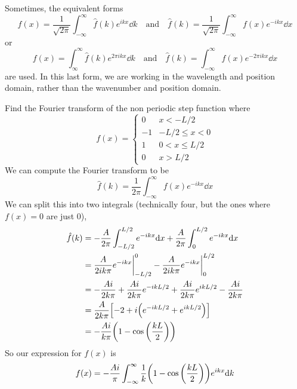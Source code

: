 Sometimes, the equivalent forms
\[ f(x) = \frac{1}{\sqrt{2\pi}}\int_{-\infty}^\infty \hat f(k)e^{ikx}\dd k \quad\text{and}\quad \hat f(k) = \frac{1}{\sqrt{2\pi}} \int_{-\infty}^\infty f(x)e^{-ikx}\dd x\]
or
\[ f(x) = \int_{\infty}^\infty \hat f(k)e^{2\pi ikx} \dd k \quad\text{and}\quad \hat f(k) = \int_{-\infty}^\infty f(x)e^{-2\pi ikx}\dd x\]
are used. In this last form, we are working in the wavelength and position domain, rather than the wavenumber and position domain.
\begin{example}
    Find the Fourier transform of the non periodic step function where 
    \[ f(x) = \begin{cases}
        0 & x < -L/2 \\
        -1 & -L/2 \le  x < 0 \\
        1 & 0 < x \le L/2 \\
        0 & x > L/2
    \end{cases}\]
    We can compute the Fourier transform to be
    \[ \hat f(k) = \frac{1}{2\pi} \int_{-\infty}^\infty f(x)e^{-ikx}\dd x\]
    We can split this into two integrals (technically four, but the ones where $f(x) =0$ are just $0$),
    \begin{align*}
        \hat f(k) &= -\frac{A}{2\pi}\int_{-L/2}^{L/2} e^{-ikx}\dd x + \frac{A}{2\pi}\int_{0}^{L/2} e^{-ikx} \dd x \\
        &= \frac{A}{2ik \pi }e^{-ikx}\biggr|_{-L/2}^{0} - \frac{A}{2i k\pi}e^{-ikx}\biggr|_{0}^{L/2} \\
        &= -\frac{Ai}{2k\pi} + \frac{Ai}{2k \pi}e^{-ikL/2} + \frac{Ai}{2k\pi}e^{ikL/2} - \frac{Ai}{2k\pi} \\
        &= \frac{A}{2k\pi}\bqty{-2+i\pqty{e^{-ikL/2} + e^{ikL/2}}} \\
        &= -\frac{Ai}{k\pi}\pqty{1-\cos\pqty{\frac{kL}{2}}}
    \end{align*}
    So our expression for $f(x)$ is
    \[ f(x) = -\frac{Ai}{\pi} \int_{-\infty}^\infty \frac{1}{k}\pqty{1-\cos\pqty{\frac{kL}{2}}}e^{ikx}\dd k\]
    
\end{example}